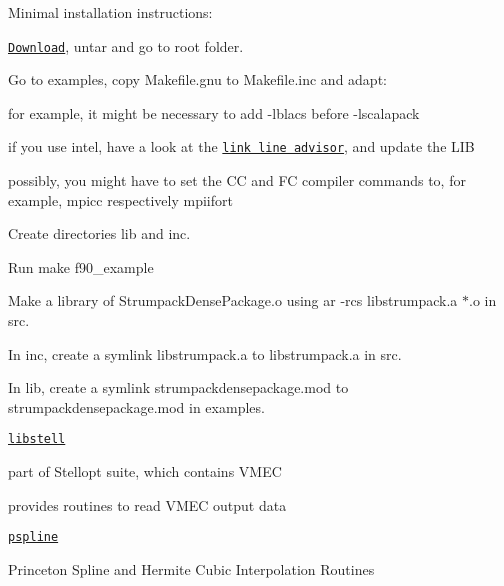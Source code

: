 \begin{DoxyItemize}
\begin{DoxyItemize}
\item Minimal installation instructions\+:
\begin{DoxyEnumerate}
\item \href{http://portal.nersc.gov/project/sparse/strumpack/STRUMPACK-Dense-1.1.1.tar.gz}{\tt Download}, untar and go to root folder.
\item Go to examples, copy {\ttfamily Makefile.\+gnu} to {\ttfamily Makefile.\+inc} and adapt\+:
\begin{DoxyEnumerate}
\item for example, it might be necessary to add {\ttfamily -\/lblacs} before {\ttfamily -\/lscalapack}
\item if you use intel, have a look at the \href{https://software.intel.com/en-us/articles/intel-mkl-link-line-advisor}{\tt link line advisor}, and update the {\ttfamily L\+IB}
\item possibly, you might have to set the {\ttfamily CC} and {\ttfamily FC} compiler commands to, for example, {\ttfamily mpicc} respectively {\ttfamily mpiifort}
\end{DoxyEnumerate}
\item Create directories {\ttfamily lib} and {\ttfamily inc}.
\item Run {\ttfamily make f90\+\_\+example}
\item Make a library of {\ttfamily Strumpack\+Dense\+Package.\+o} using {\ttfamily ar -\/rcs libstrumpack.\+a $\ast$.o} in src.
\item In inc, create a symlink {\ttfamily libstrumpack.\+a} to {\ttfamily libstrumpack.\+a} in src.
\item In lib, create a symlink {\ttfamily strumpackdensepackage.\+mod} to {\ttfamily strumpackdensepackage.\+mod} in examples.
\end{DoxyEnumerate}
\end{DoxyItemize}
\item \href{https://bitbucket.org/lazerson_princeton/stellopt/wiki/Home}{\tt libstell}
\begin{DoxyItemize}
\item part of Stellopt suite, which contains V\+M\+EC
\item provides routines to read V\+M\+EC output data
\end{DoxyItemize}
\item \href{https://w3.pppl.gov/ntcc/PSPLINE/}{\tt pspline}
\begin{DoxyItemize}
\item Princeton Spline and Hermite Cubic Interpolation Routines

\end{DoxyItemize}
\end{DoxyItemize}
